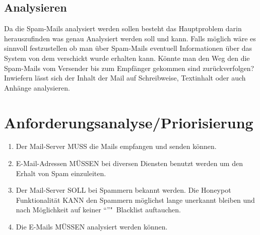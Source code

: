 \documentclass[a4paper,11pt,singlespacing]{article}
\begin{document}
	\subsection{Analysieren}\label{sec:ProblemstellungAnalysieren}
		Da die Spam-Mails analysiert werden sollen besteht das Hauptproblem darin herauszufinden was genau Analysiert werden soll und kann.
		Falls möglich wäre es sinnvoll festzustellen ob man über Spam-Mails eventuell Informationen über das System von dem verschickt wurde erhalten kann.
		Könnte man den Weg den die Spam-Mails vom Versender bis zum Empfänger gekommen sind zurückverfolgen?
		Inwiefern lässt sich der Inhalt der Mail auf Schreibweise, Textinhalt oder auch Anhänge analysieren.


\section{Anforderungsanalyse/Priorisierung}\label{sec:AnforderungsanalysePriorisierung}
	\begin{enumerate}
	\item Der Mail-Server MUSS die Mails empfangen und senden können. %
	\item E-Mail-Adressen MÜSSEN bei diversen Diensten benutzt werden um den Erhalt von Spam einzuleiten. %
	\item Der Mail-Server SOLL bei Spammern bekannt werden. Die Honeypot Funktionalität KANN den Spammern möglichst lange unerkannt bleiben und nach Möglichkeit auf keiner "`"'"~Blacklist auftauchen. %
	\item Die E-Mails MÜSSEN analysiert werden können.
	\end{enumerate}


%
%
%
%
%
%
\end{document}
